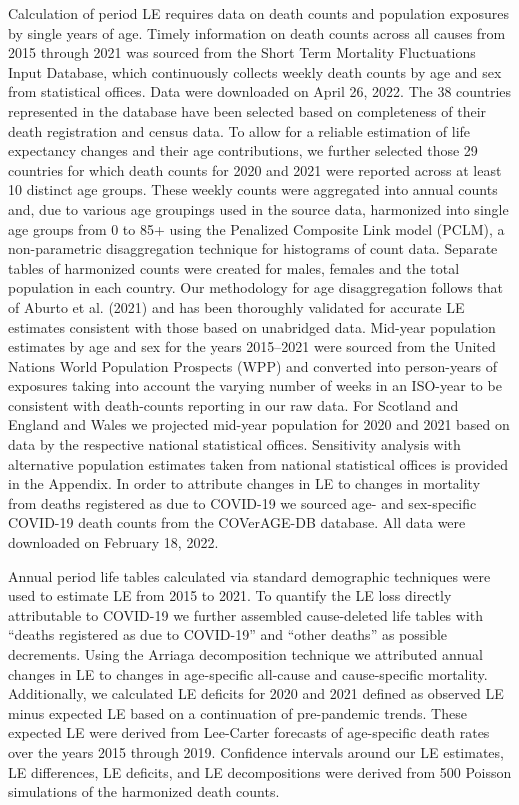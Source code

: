 \documentclass[12pt]{article}
\begin{document}
Calculation of period LE requires data on death counts and population exposures by single years of age. Timely information on death counts across all causes from 2015 through 2021 was sourced from the Short Term Mortality Fluctuations Input Database,\citealp{Jdanov2021, Nemeth2021} which continuously collects weekly death counts by age and sex from statistical offices. Data were downloaded on April 26, 2022. The 38 countries represented in the database have been selected based on completeness of their death registration and census data. To allow for a reliable estimation of life expectancy changes and their age contributions, we further selected those 29 countries for which death counts for 2020 and 2021 were reported across at least 10 distinct age groups. These weekly counts were aggregated into annual counts and, due to various age groupings used in the source data, harmonized into single age groups from 0 to 85+ using the Penalized Composite Link model (PCLM),\citealp{Rizzi2015, Pascariu2018} a non-parametric disaggregation technique for histograms of count data. Separate tables of harmonized counts were created for males, females and the total population in each country. Our methodology for age disaggregation follows that of Aburto et al. (2021)\citealp{Aburto2021b} and has been thoroughly validated for accurate LE estimates consistent with those based on unabridged data. Mid-year population estimates by age and sex for the years 2015--2021 were sourced from the United Nations World Population Prospects (WPP)\citealp{UnitedNations2021} and converted into person-years of exposures taking into account the varying number of weeks in an ISO-year \citealp{IOS2021} to be consistent with death-counts reporting in our raw data. For Scotland and England and Wales we projected mid-year population for 2020 and 2021 based on data by the respective national statistical offices. Sensitivity analysis with alternative population estimates taken from national statistical offices is provided in the Appendix. In order to attribute changes in LE to changes in mortality from deaths registered as due to COVID-19 we sourced age- and sex-specific COVID-19 death counts from the COVerAGE-DB database.\citealp{Riffe2021} All data were downloaded on February 18, 2022.

Annual period life tables calculated via standard demographic techniques\citealp{Chiang1979} were used to estimate LE from 2015 to 2021. To quantify the LE loss directly attributable to COVID-19 we further assembled cause-deleted life tables with ``deaths registered as due to COVID-19'' and ``other deaths'' as possible decrements.\citealp{Preston2001} Using the Arriaga decomposition technique\citealp{Arriaga1984} we attributed annual changes in LE to changes in age-specific all-cause and cause-specific mortality. Additionally, we calculated LE deficits for 2020 and 2021 defined as observed LE minus expected LE based on a continuation of pre-pandemic trends. These expected LE were derived from Lee-Carter forecasts\citealp{Lee1992} of age-specific death rates over the years 2015 through 2019. Confidence intervals around our LE estimates, LE differences, LE deficits, and LE decompositions were derived from 500 Poisson simulations of the harmonized death counts.
\end{document}
